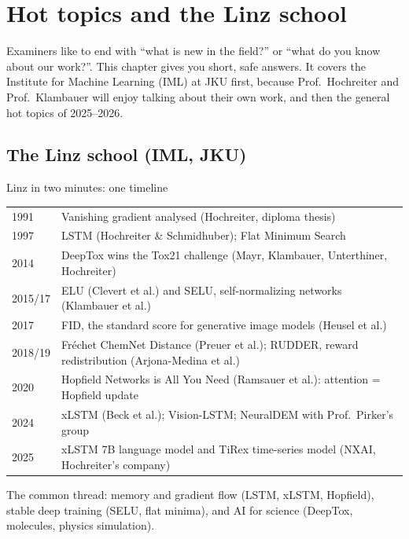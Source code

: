 \section{Hot topics and the Linz school}

Examiners like to end with ``what is new in the field?'' or ``what do you know about our
work?''. This chapter gives you short, safe answers. It covers the Institute for Machine Learning
(IML) at JKU first, because Prof.\ Hochreiter and Prof.\ Klambauer will enjoy talking about their
own work, and then the general hot topics of 2025--2026.

\subsection{The Linz school (IML, JKU)}

\begin{summary}{Linz in two minutes: one timeline}
\begin{tabularx}{\linewidth}{@{}l>{\raggedright\arraybackslash}X@{}}
1991 & Vanishing gradient analysed (Hochreiter, diploma thesis) \\
1997 & LSTM (Hochreiter \& Schmidhuber); Flat Minimum Search \\
2014 & DeepTox wins the Tox21 challenge (Mayr, Klambauer, Unterthiner, Hochreiter) \\
2015/17 & ELU (Clevert et al.) and SELU, self-normalizing networks (Klambauer et al.) \\
2017 & FID, the standard score for generative image models (Heusel et al.) \\
2018/19 & Fr\'echet ChemNet Distance (Preuer et al.); RUDDER, reward redistribution (Arjona-Medina et al.) \\
2020 & Hopfield Networks is All You Need (Ramsauer et al.): attention = Hopfield update \\
2024 & xLSTM (Beck et al.); Vision-LSTM; NeuralDEM with Prof.\ Pirker's group \\
2025 & xLSTM 7B language model and TiRex time-series model (NXAI, Hochreiter's company)
\end{tabularx}
\medskip

\textsf{The common thread:} memory and gradient flow (LSTM, xLSTM, Hopfield), stable deep training
(SELU, flat minima), and AI for science (DeepTox, molecules, physics simulation).
\end{summary}


